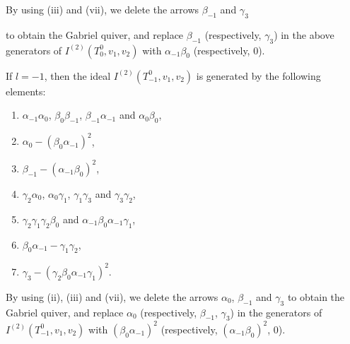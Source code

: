 \documentclass[12pt]{amsart}
\numberwithin{equation}{thm}
\begin{document}
By using (iii) and (vii), we delete the arrows $\beta_{-1}$ and $\gamma_3$ {to obtain the Gabriel quiver, and replace $\beta_{-1}$ (respectively, $\gamma_3$) 
in the above generators of $I^{(2)}(T_{0}^{0},v_{1},v_{2})$ with $\alpha_{-1}\beta_0$ (respectively, $0$).

If $l=-1$, then  the ideal $I^{(2)}(T_{-1}^{0},v_{1},v_{2})$ is generated by the following elements:
\begin{enumerate}
\item $\alpha_{-1}\alpha_{0}$, $\beta_{0}\beta_{-1}$, $\beta_{-1}\alpha_{-1}$ and $\alpha_{0}\beta_{0}$,
\item $\alpha_0-(\beta_0\alpha_{-1})^2$,
\item $\beta_{-1}-(\alpha_{-1}\beta_0)^2$,
\item $\gamma_2\alpha_0$, $\alpha_0\gamma_1$, $\gamma_1\gamma_3$ and $\gamma_3\gamma_2$,
\item $\gamma_2\gamma_1\gamma_2\beta_0$ and $\alpha_{-1}\beta_0\alpha_{-1}\gamma_1$,
\item $\beta_0\alpha_{-1}-\gamma_1\gamma_2$,
\item $\gamma_3-(\gamma_2\beta_0\alpha_{-1}\gamma_1)^2$.
\end{enumerate}
By using (ii), (iii) and (vii), we delete the arrows $\alpha_{0}$, $\beta_{-1}$ and $\gamma_3$ 
to obtain the Gabriel quiver, 
and replace $\alpha_{0}$ (respectively, $\beta_{-1}$, $\gamma_3$) in the generators of $I^{(2)}(T_{-1}^{0},v_{1},v_{2})$ 
with $(\beta_0\alpha_{-1})^2$ (respectively, $(\alpha_{-1}\beta_0)^2$, $0$).

}
\end{document}
